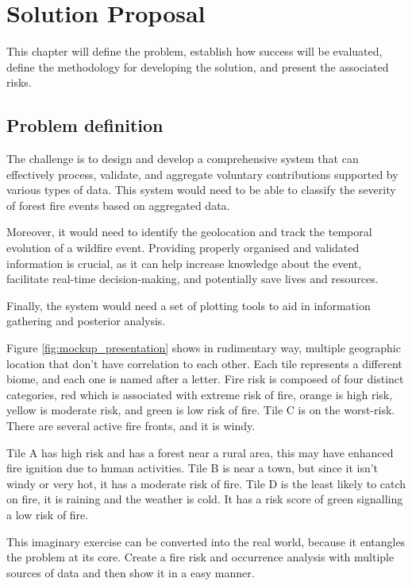\chapter{Solution Proposal}
\label{sec:solution_proposal}

This chapter will define the problem, establish how success will be evaluated, define the methodology for developing the solution, and present the associated risks.

\section{Problem definition}


The challenge is to design and develop a comprehensive system that can effectively process, validate, and aggregate voluntary contributions supported by various types of data. This system would need to be able to classify the severity of forest fire events based on aggregated data.

Moreover, it would need to identify the geolocation and track the temporal evolution of a wildfire event. Providing properly organised and validated information is crucial, as it can help increase knowledge about the event, facilitate real-time decision-making, and potentially save lives and resources.


Finally, the system would need a set of plotting tools to aid in information gathering and posterior analysis.



Figure \ref{fig:mockup_presentation} shows in rudimentary way, multiple geographic location that don't have correlation to each other. Each tile represents a different biome, and each one is named after a letter. Fire risk is composed of four distinct categories, red which is associated with extreme risk of fire, orange is high risk, yellow is moderate risk, and green is low risk of fire.
Tile C is on the worst-risk. There are several active fire fronts, and it is windy. 


Tile A has high risk and has a forest near a rural area, this may have enhanced fire ignition due to human activities. Tile B is near a town, but since it isn't windy or very hot, it has a moderate risk of fire. Tile D is the least likely to catch on fire, it is raining and the weather is cold. It has a risk score of green signalling a low risk of fire.


This imaginary exercise can be converted into the real world, because it entangles the problem at its core. Create a fire risk and occurrence analysis with multiple sources of data and then show it in a easy manner.


